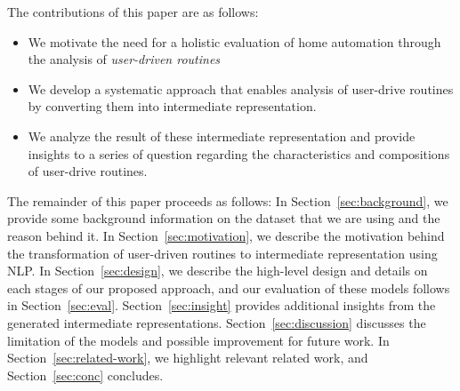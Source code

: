 %
The contributions of this paper are as follows:
\begin{itemize}
    \item We motivate the need for a holistic evaluation of home automation through the analysis of {\em user-driven routines}
    \item We develop a systematic approach that enables analysis of user-drive routines by converting them into intermediate representation. 
    \item We analyze the result of these intermediate representation and provide insights to a series of question regarding the characteristics and compositions of user-drive routines.
\end{itemize}


The remainder of this paper proceeds as follows:
In Section~\ref{sec:background}, we provide some background information on the dataset that we are using and the reason behind it.
In Section~\ref{sec:motivation}, we describe the motivation behind the transformation of user-driven routines to intermediate representation using NLP.
In Section~\ref{sec:design}, we describe the high-level design and details on each stages of our proposed approach, and our evaluation of these models follows in Section~\ref{sec:eval}. 
Section~\ref{sec:insight} provides additional insights from the generated intermediate representations.
Section~\ref{sec:discussion} discusses the limitation of the models and possible improvement for future work.
In Section~\ref{sec:related-work}, we highlight relevant related work, and 
Section~\ref{sec:conc} concludes.
